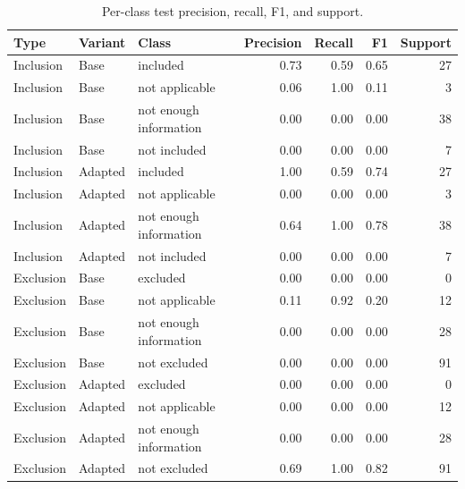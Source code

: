 \begin{table}[t]\centering\caption{Per-class test precision, recall, F1, and support.}\small\begin{tabular}{lllrrrr}\toprule Type & Variant & Class & Precision & Recall & F1 & Support \\
\midrule
Inclusion & Base & included & 0.73 & 0.59 & 0.65 & 27 \\
Inclusion & Base & not applicable & 0.06 & 1.00 & 0.11 & 3 \\
Inclusion & Base & not enough information & 0.00 & 0.00 & 0.00 & 38 \\
Inclusion & Base & not included & 0.00 & 0.00 & 0.00 & 7 \\
Inclusion & Adapted & included & 1.00 & 0.59 & 0.74 & 27 \\
Inclusion & Adapted & not applicable & 0.00 & 0.00 & 0.00 & 3 \\
Inclusion & Adapted & not enough information & 0.64 & 1.00 & 0.78 & 38 \\
Inclusion & Adapted & not included & 0.00 & 0.00 & 0.00 & 7 \\
Exclusion & Base & excluded & 0.00 & 0.00 & 0.00 & 0 \\
Exclusion & Base & not applicable & 0.11 & 0.92 & 0.20 & 12 \\
Exclusion & Base & not enough information & 0.00 & 0.00 & 0.00 & 28 \\
Exclusion & Base & not excluded & 0.00 & 0.00 & 0.00 & 91 \\
Exclusion & Adapted & excluded & 0.00 & 0.00 & 0.00 & 0 \\
Exclusion & Adapted & not applicable & 0.00 & 0.00 & 0.00 & 12 \\
Exclusion & Adapted & not enough information & 0.00 & 0.00 & 0.00 & 28 \\
Exclusion & Adapted & not excluded & 0.69 & 1.00 & 0.82 & 91 \\
\bottomrule\end{tabular}\end{table}